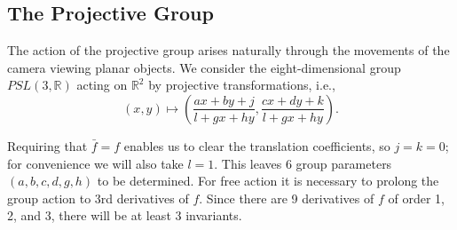 \documentclass{artjlt}
\def\R{\mathbb{R}}
\begin{document}




\subsection{The Projective Group}\label{sec:projective}

The action of the projective group arises naturally through the movements of the camera viewing planar objects.
We consider the eight-dimensional group $PSL(3,\R)$ acting on $\R^2$ by projective transformations, i.e., 
\begin{equation}
(x,y) \mapsto \left(\frac{a x + b y + j}{l + g x + h y}, \frac{c x + d y + k}{l+ g x + h y}\right).
\end{equation}

Requiring that $\bar f = f$ enables us to clear the translation coefficients, so $j=k=0$; for convenience we will also take $l=1$. This leaves 6 group parameters $(a,b,c,d,g,h)$ to be determined. For free action it is necessary to prolong the group action to 3rd derivatives of $f$. Since there are 9 derivatives of $f$ of order 1, 2, and 3, there will be at least 3 invariants.
\end{document}
